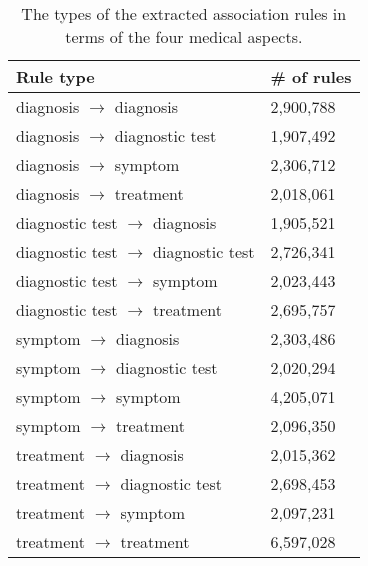 \documentclass[1p]{elsarticle}
\begin{document}
\begin{table}[tb]
\caption{The types of the extracted association rules in terms of the four medical aspects.}\label{tab:rule:count}
  \centering
\begin{tabular}{|l|l|}
    \hline
Rule type & \# of rules \\ \hline
diagnosis $\rightarrow$ diagnosis&2,900,788\\
diagnosis $\rightarrow$ diagnostic test&1,907,492\\
diagnosis $\rightarrow$ symptom&2,306,712\\
diagnosis $\rightarrow$ treatment&2,018,061\\
diagnostic test $\rightarrow$ diagnosis&1,905,521\\
diagnostic test $\rightarrow$ diagnostic test&2,726,341\\
diagnostic test $\rightarrow$ symptom&2,023,443\\
diagnostic test $\rightarrow$ treatment&2,695,757\\
symptom $\rightarrow$ diagnosis&2,303,486\\
symptom $\rightarrow$ diagnostic test&2,020,294\\
symptom $\rightarrow$ symptom&4,205,071\\
symptom $\rightarrow$ treatment&2,096,350\\
treatment $\rightarrow$ diagnosis&2,015,362\\
treatment $\rightarrow$ diagnostic test&2,698,453\\
treatment $\rightarrow$ symptom&2,097,231\\
treatment $\rightarrow$ treatment&6,597,028\\
\hline
  \end{tabular}   
\end{table}
\end{document}
